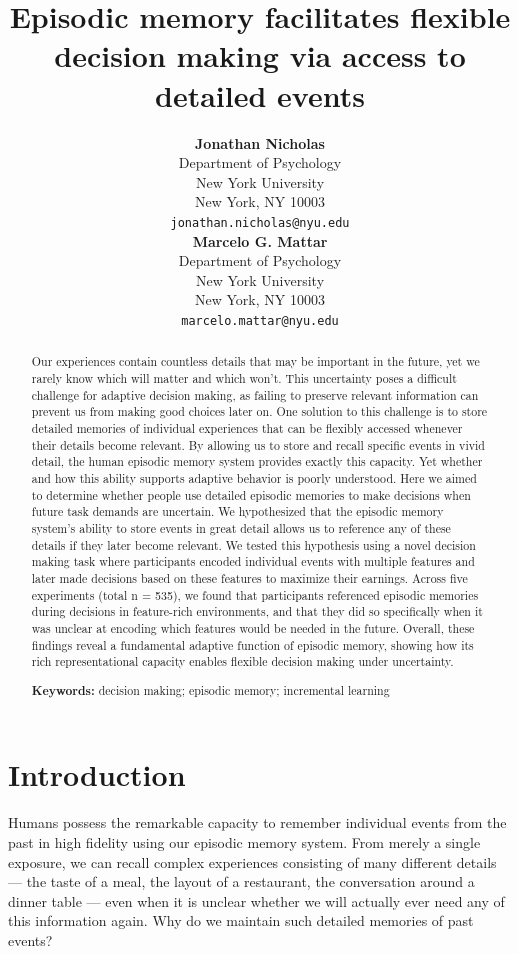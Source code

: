 \documentclass[10pt,letterpaper]{article}
\title{Episodic memory facilitates flexible decision making via access to detailed events}
\author{
{\large \bf Jonathan Nicholas} \\
Department of Psychology \\
New York University \\
New York, NY 10003 \\
\texttt{jonathan.nicholas@nyu.edu} \\
\And
{\large \bf Marcelo G. Mattar} \\
Department of Psychology \\
New York University \\
New York, NY 10003 \\
\texttt{marcelo.mattar@nyu.edu}
}
\begin{document}
\maketitle

\begin{abstract}

Our experiences contain countless details that may be important in the future, yet we rarely know which will matter and which won't. This uncertainty poses a difficult challenge for adaptive decision making, as failing to preserve relevant information can prevent us from making good choices later on. One solution to this challenge is to store detailed memories of individual experiences that can be flexibly accessed whenever their details become relevant. By allowing us to store and recall specific events in vivid detail, the human episodic memory system provides exactly this capacity. Yet whether and how this ability supports adaptive behavior is poorly understood. Here we aimed to determine whether people use detailed episodic memories to make decisions when future task demands are uncertain. We hypothesized that the episodic memory system's ability to store events in great detail allows us to reference any of these details if they later become relevant. We tested this hypothesis using a novel decision making task where participants encoded individual events with multiple features and later made decisions based on these features to maximize their earnings. Across five experiments (total n = 535), we found that participants referenced episodic memories during decisions in feature-rich environments, and that they did so specifically when it was unclear at encoding which features would be needed in the future. Overall, these findings reveal a fundamental adaptive function of episodic memory, showing how its rich representational capacity enables flexible decision making under uncertainty.

\textbf{Keywords:} 
decision making; episodic memory; incremental learning

\end{abstract}

\section{Introduction}

Humans possess the remarkable capacity to remember individual events from the past in high fidelity using our episodic memory system\cite{tulvingEpisodicSemanticMemory1972, eichenbaumHippocampusMechanismsDeclarative1999}. From merely a single exposure, we can recall complex experiences consisting of many different details --- the taste of a meal, the layout of a restaurant, the conversation around a dinner table --- even when it is unclear whether we will actually ever need any of this information again. Why do we maintain such detailed memories of past events?
\end{document}
